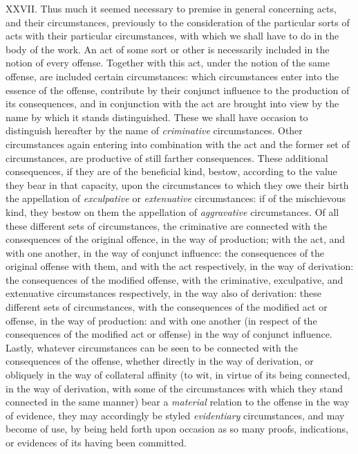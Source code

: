 \documentclass[12pt]{report}
\begin{document}
XXVII. Thus much it seemed necessary to premise in general concerning
acts, and their circumstances, previously to the consideration of the
particular sorts of acts with their particular circumstances, with which
we shall have to do in the body of the work. An act of some sort or
other is necessarily included in the notion of every offense. Together
with this act, under the notion of the same offense, are included
certain circumstances: which circumstances enter into the essence of the
offense, contribute by their conjunct influence to the production of its
consequences, and in conjunction with the act are brought into view by
the name by which it stands distinguished. These we shall have occasion
to distinguish hereafter by the name of \emph{criminative}
circumstances. Other circumstances again entering into combination with
the act and the former set of circumstances, are productive of still
farther consequences. These additional consequences, if they are of the
beneficial kind, bestow, according to the value they bear in that
capacity, upon the circumstances to which they owe their birth the
appellation of \emph{exculpative} or \emph{extenuative} circumstances:
if of the mischievous kind, they bestow on them the appellation of
\emph{aggravative} circumstances. Of all these different sets of
circumstances, the criminative are connected with the consequences of
the original offence, in the way of production; with the act, and with
one another, in the way of conjunct influence: the consequences of the
original offense with them, and with the act respectively, in the way of
derivation: the consequences of the modified offense, with the
criminative, exculpative, and extenuative circumstances respectively, in
the way also of derivation: these different sets of circumstances, with
the consequences of the modified act or offense, in the way of
production: and with one another (in respect of the consequences of the
modified act or offense) in the way of conjunct influence. Lastly,
whatever circumstances can be seen to be connected with the consequences
of the offense, whether directly in the way of derivation, or obliquely
in the way of collateral affinity (to wit, in virtue of its being
connected, in the way of derivation, with some of the circumstances with
which they stand connected in the same manner) bear a \emph{material}
relation to the offense in the way of evidence, they may accordingly be
styled \emph{evidentiary} circumstances, and may become of use, by being
held forth upon occasion as so many proofs, indications, or evidences of
its having been committed.
\end{document}
